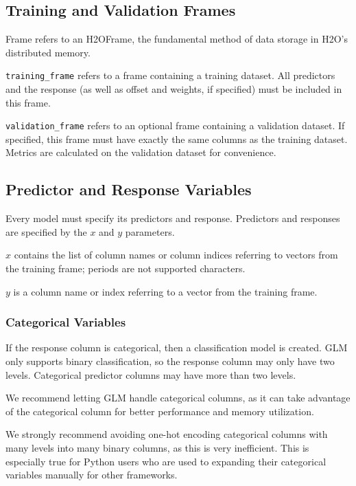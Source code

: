 \subsection{Training and Validation Frames}

Frame refers to an H2OFrame, the fundamental method of data storage in H2O's distributed memory.

\texttt{training\_frame} refers to a frame containing a training dataset.  All predictors and the response (as
well as offset and weights, if specified) must be included in this frame.

\texttt{validation\_frame} refers to an optional frame containing a validation dataset.  If specified, this 
frame must have exactly the same columns as the training dataset.  Metrics are calculated on the validation dataset for convenience.


\subsection{Predictor and Response Variables}

Every model must specify its predictors and response.  Predictors and responses are specified by the $x$
and $y$ parameters.

$x$ contains the list of column names or column indices referring to vectors from the training frame; periods are not supported characters.

$y$ is a column name or index referring to a vector from the training frame.

\subsubsection{Categorical Variables}

If the response column is categorical, then a classification model is created.  GLM only supports binary
classification, so the response column may only have two levels. Categorical predictor columns may have more than two levels.

We recommend letting GLM handle categorical columns, as it can take advantage of the categorical
column for better performance and memory utilization.

We strongly recommend avoiding one-hot encoding categorical columns with many levels into many binary columns, as this is very inefficient.  This is especially true for Python users who are used to expanding their categorical variables manually for other frameworks.

